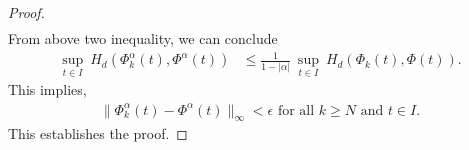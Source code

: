 \documentclass[10pt,a4paper]{amsart}
\begin{document}
\begin{proof}
\begin{align*}
    \end{align*}
    From above two inequality, we can conclude
    \begin{align*}
         \underset{t\in I}{\sup}~H_d(\Phi^{\alpha}_{k}(t), \Phi^{\alpha}(t)) &\leq \frac{1}{1-\lvert \alpha \rvert}~\underset{t\in I}{\sup}~H_d(\Phi_{k}(t),\Phi(t)).
        \end{align*}
        This implies,
        \begin{align*}
            \lVert \Phi_k^{\alpha} (t)- \Phi^\alpha(t)\rVert _\infty < \epsilon \text{ for all } k\geq N \text{ and } t \in I.
        \end{align*}
This establishes the proof.


\end{proof}
\end{document}
